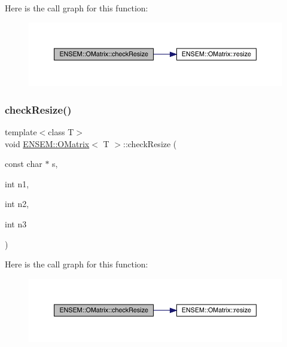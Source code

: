 Here is the call graph for this function\+:
\nopagebreak
\begin{figure}[H]
\begin{center}
\leavevmode
\includegraphics[width=350pt]{dd/d80/classENSEM_1_1OMatrix_a532d2138ecffc7a153b831401ca8b4df_cgraph}
\end{center}
\end{figure}
\mbox{\label{classENSEM_1_1OMatrix_a532d2138ecffc7a153b831401ca8b4df}} 
\subsubsection{\texorpdfstring{checkResize()}{checkResize()}\hspace{0.1cm}{\footnotesize\ttfamily [6/6]}}
{\footnotesize\ttfamily template$<$class T$>$ \\
void \mbox{\hyperlink{classENSEM_1_1OMatrix}{E\+N\+S\+E\+M\+::\+O\+Matrix}}$<$ T $>$\+::check\+Resize (\begin{DoxyParamCaption}\item[{const char $\ast$}]{s,  }\item[{int}]{n1,  }\item[{int}]{n2,  }\item[{int}]{n3 }\end{DoxyParamCaption})\hspace{0.3cm}{\ttfamily [inline]}}

Here is the call graph for this function\+:
\nopagebreak
\begin{figure}[H]
\begin{center}
\leavevmode
\includegraphics[width=350pt]{dd/d80/classENSEM_1_1OMatrix_a532d2138ecffc7a153b831401ca8b4df_cgraph}
\end{center}
\end{figure}
\mbox{\label{classENSEM_1_1OMatrix_abec80929ab7e8e2a23822fbbc841bd87}} 
